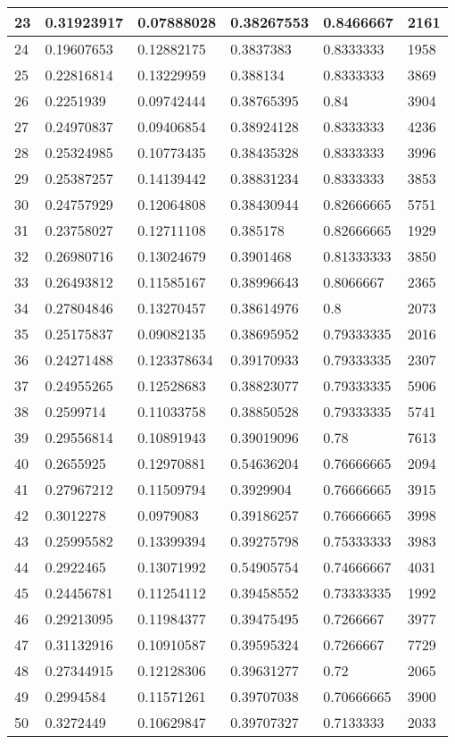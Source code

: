 \begin{longtable}{|l|l|l|l|l|l|}
23 & 0.31923917 & 0.07888028 & 0.38267553 & 0.8466667 & 2161 \\ \hline 
24 & 0.19607653 & 0.12882175 & 0.3837383 & 0.8333333 & 1958 \\ \hline 
25 & 0.22816814 & 0.13229959 & 0.388134 & 0.8333333 & 3869 \\ \hline 
26 & 0.2251939 & 0.09742444 & 0.38765395 & 0.84 & 3904 \\ \hline 
27 & 0.24970837 & 0.09406854 & 0.38924128 & 0.8333333 & 4236 \\ \hline 
28 & 0.25324985 & 0.10773435 & 0.38435328 & 0.8333333 & 3996 \\ \hline 
29 & 0.25387257 & 0.14139442 & 0.38831234 & 0.8333333 & 3853 \\ \hline 
30 & 0.24757929 & 0.12064808 & 0.38430944 & 0.82666665 & 5751 \\ \hline 
31 & 0.23758027 & 0.12711108 & 0.385178 & 0.82666665 & 1929 \\ \hline 
32 & 0.26980716 & 0.13024679 & 0.3901468 & 0.81333333 & 3850 \\ \hline 
33 & 0.26493812 & 0.11585167 & 0.38996643 & 0.8066667 & 2365 \\ \hline 
34 & 0.27804846 & 0.13270457 & 0.38614976 & 0.8 & 2073 \\ \hline 
35 & 0.25175837 & 0.09082135 & 0.38695952 & 0.79333335 & 2016 \\ \hline 
36 & 0.24271488 & 0.123378634 & 0.39170933 & 0.79333335 & 2307 \\ \hline 
37 & 0.24955265 & 0.12528683 & 0.38823077 & 0.79333335 & 5906 \\ \hline 
38 & 0.2599714 & 0.11033758 & 0.38850528 & 0.79333335 & 5741 \\ \hline 
39 & 0.29556814 & 0.10891943 & 0.39019096 & 0.78 & 7613 \\ \hline 
40 & 0.2655925 & 0.12970881 & 0.54636204 & 0.76666665 & 2094 \\ \hline 
41 & 0.27967212 & 0.11509794 & 0.3929904 & 0.76666665 & 3915 \\ \hline 
42 & 0.3012278 & 0.0979083 & 0.39186257 & 0.76666665 & 3998 \\ \hline 
43 & 0.25995582 & 0.13399394 & 0.39275798 & 0.75333333 & 3983 \\ \hline 
44 & 0.2922465 & 0.13071992 & 0.54905754 & 0.74666667 & 4031 \\ \hline 
45 & 0.24456781 & 0.11254112 & 0.39458552 & 0.73333335 & 1992 \\ \hline 
46 & 0.29213095 & 0.11984377 & 0.39475495 & 0.7266667 & 3977 \\ \hline 
47 & 0.31132916 & 0.10910587 & 0.39595324 & 0.7266667 & 7729 \\ \hline 
48 & 0.27344915 & 0.12128306 & 0.39631277 & 0.72 & 2065 \\ \hline 
49 & 0.2994584 & 0.11571261 & 0.39707038 & 0.70666665 & 3900 \\ \hline 
50 & 0.3272449 & 0.10629847 & 0.39707327 & 0.7133333 & 2033 \\ \hline 
\end{longtable}